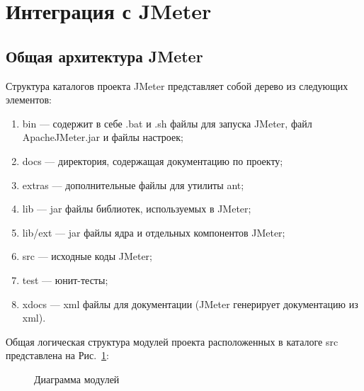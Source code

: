 \section{Интеграция с JMeter}

\subsection{Общая архитектура JMeter}

Структура каталогов проекта JMeter представляет собой дерево из следующих элементов:

\begin{enumerate}
\item bin --- содержит в себе .bat и .sh файлы для запуска JMeter, файл ApacheJMeter.jar и файлы настроек;
\item docs --- директория, содержащая документацию по проекту;
\item extras --- дополнительные файлы для утилиты ant;
\item lib --- jar файлы библиотек, используемых в JMeter;
\item lib/ext --- jar файлы ядра и отдельных компонентов JMeter;
\item src --- исходные коды JMeter;
\item test --- юнит-тесты;
\item xdocs --- xml файлы для документации (JMeter генерирует документацию из xml).
\end{enumerate}

Общая логическая структура модулей проекта расположенных в каталоге src
представлена на Рис.~\ref{ris:Diagram3.png}:

\begin{figure}[ht]
\caption{Диаграмма модулей}
\label{ris:Diagram3.png}
\end{figure}

